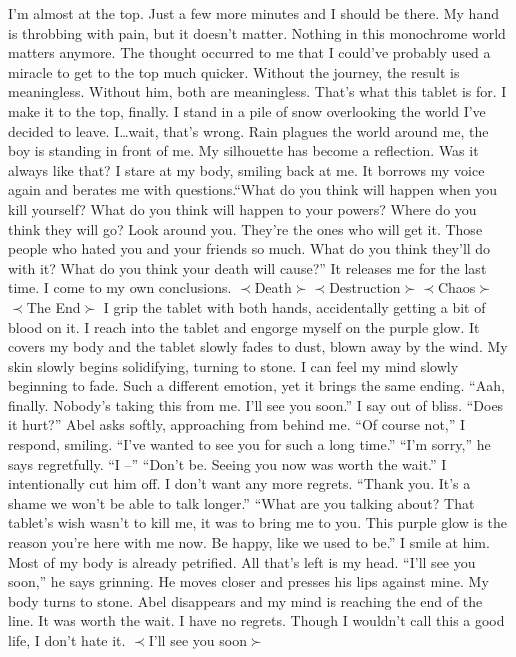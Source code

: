 \documentclass[openany, 12pt]{book}
\newcommand\tab[1][1cm]{\hspace*{#1}}
\newcommand\suck[1]{$\prec$#1$\succ$}
\begin{document}
\newline
\tab
I’m almost at the top. Just a few more minutes and I should be there. My hand is throbbing with pain, but it doesn’t matter. Nothing in this monochrome world matters anymore. The thought occurred to me that I could’ve probably used a miracle to get to the top much quicker. Without the journey, the result is meaningless. Without him, both are meaningless. That’s what this tablet is for.
\newline
\tab
I make it to the top, finally. I stand in a pile of snow overlooking the world I’ve decided to leave. I…wait, that’s wrong. Rain plagues the world around me, the boy is standing in front of me. My silhouette has become a reflection. Was it always like that? I stare at my body, smiling back at me. It borrows my voice again and berates me with questions.``What do you think will happen when you kill yourself? What do you think will happen to your powers? Where do you think they will go? Look around you. They’re the ones who will get it. Those people who hated you and your friends so much. What do you think they’ll do with it? What do you think your death will cause?'' It releases me for the last time. I come to my own conclusions.
\newline
\suck{Death}\tab\suck{Destruction}\tab\suck{Chaos}
\newline
\tab\tab\tab\suck{The End}
\newline
\tab
I grip the tablet with both hands, accidentally getting a bit of blood on it. I reach into the tablet and engorge myself on the purple glow. It covers my body and the tablet slowly fades to dust, blown away by the wind. My skin slowly begins solidifying, turning to stone. I can feel my mind slowly beginning to fade. Such a different emotion, yet it brings the same ending. 
\newline
\tab
``Aah, finally. Nobody’s taking this from me. I’ll see you soon.'' I say out of bliss.
\newline
\tab
``Does it hurt?'' Abel asks softly, approaching from behind me.
\newline
\tab
``Of course not,'' I respond, smiling. ``I’ve wanted to see you for such a long time.''
\newline
\tab
``I’m sorry,'' he says regretfully. ``I --''
\newline
\tab
``Don’t be. Seeing you now was worth the wait.'' I intentionally cut him off. I don’t want any more regrets.
\newline
\tab
``Thank you. It’s a shame we won’t be able to talk longer.''
\newline
\tab
``What are you talking about? That tablet’s wish wasn’t to kill me, it was to bring me to you. This purple glow is the reason you’re here with me now. Be happy, like we used to be.'' I smile at him. Most of my body is already petrified. All that’s left is my head.
\newline
\tab
``I’ll see you soon,'' he says grinning. He moves closer and presses his lips against mine. My body turns to stone. Abel disappears and my mind is reaching the end of the line. It was worth the wait. I have no regrets. Though I wouldn’t call this a good life, I don’t hate it.
\newline
\suck{I’ll see you soon}
\backmatter
\end{document}
